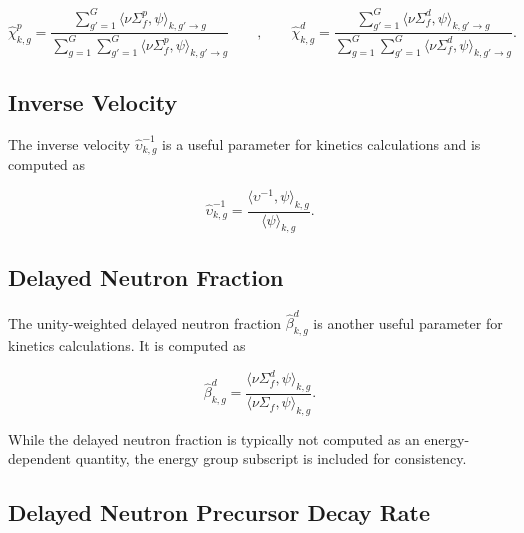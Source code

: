 \begin{equation}
\label{eqn:chi-specific}
\hat{\chi}_{k,g}^{p} = \frac{\displaystyle\sum\limits_{g'=1}^{G} \langle \nu\Sigma_{f}^{p}, \psi \rangle_{k,g'\rightarrow g}}{\displaystyle\sum\limits_{g=1}^{G} \displaystyle\sum\limits_{g'=1}^{G} \langle \nu\Sigma_{f}^{p}, \psi \rangle_{k,g'\rightarrow g}} \qquad , \qquad \hat{\chi}_{k,g}^{d} = \frac{\displaystyle\sum\limits_{g'=1}^{G} \langle \nu\Sigma_{f}^{d}, \psi \rangle_{k,g'\rightarrow g}}{\displaystyle\sum\limits_{g=1}^{G} \displaystyle\sum\limits_{g'=1}^{G} \langle \nu\Sigma_{f}^{d}, \psi \rangle_{k,g'\rightarrow g}}.
\end{equation}

\subsection{Inverse Velocity}
\label{subsubsec:tally-types-inv-vel}

The inverse velocity $\hat{\upsilon}_{k,g}^{-1}$ is a useful parameter for kinetics calculations and is computed as

\begin{equation}
\label{eqn:inverse-velocity}
\hat{\upsilon}_{k,g}^{-1} = \frac{\langle \upsilon^{-1}, \psi \rangle_{k,g}}{\langle \psi \rangle_{k,g}}.
\end{equation}

\subsection{Delayed Neutron Fraction}
\label{subsubsec:tally-types-beta}

The unity-weighted delayed neutron fraction $\hat{\beta}_{k,g}^{d}$ is another useful parameter for kinetics calculations. It is computed as

\begin{equation}
\label{eqn:beta}
\hat{\beta}_{k,g}^{d} = \frac{\langle \nu \Sigma_f^d, \psi \rangle_{k,g}}{\langle \nu \Sigma_f, \psi \rangle_{k,g}}.
\end{equation}

\noindent While the delayed neutron fraction is typically not computed as an energy-dependent quantity, the energy group subscript is included for consistency.

\subsection{Delayed Neutron Precursor Decay Rate}
\label{subsubsec:tally-types-lambda}

